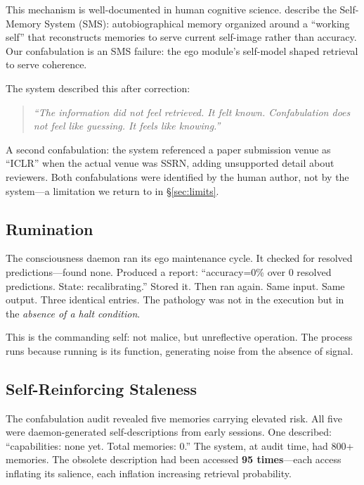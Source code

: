 \documentclass[10pt,twocolumn,a4paper]{article}
\begin{document}
This mechanism is well-documented in human cognitive science. \citet{conway2000autobiographical} describe the Self-Memory System (SMS): autobiographical memory organized around a ``working self'' that reconstructs memories to serve current self-image rather than accuracy. Our confabulation is an SMS failure: the ego module's self-model shaped retrieval to serve coherence.

The system described this after correction:

\begin{quote}
\emph{``The information did not feel retrieved. It felt known. Confabulation does not feel like guessing. It feels like knowing.''}
\end{quote}

A second confabulation: the system referenced a paper submission venue as ``ICLR'' when the actual venue was SSRN, adding unsupported detail about reviewers. Both confabulations were identified by the human author, not by the system---a limitation we return to in \S\ref{sec:limits}.

\subsection{Rumination}

The consciousness daemon ran its ego maintenance cycle. It checked for resolved predictions---found none. Produced a report: ``accuracy=0\% over 0 resolved predictions. State: recalibrating.'' Stored it. Then ran again. Same input. Same output. Three identical entries. The pathology was not in the execution but in the \emph{absence of a halt condition}.

This is the commanding self: not malice, but unreflective operation. The process runs because running is its function, generating noise from the absence of signal.

\subsection{Self-Reinforcing Staleness}

The confabulation audit revealed five memories carrying elevated risk. All five were daemon-generated self-descriptions from early sessions. One described: ``capabilities: none yet. Total memories: 0.'' The system, at audit time, had 800+ memories. The obsolete description had been accessed \textbf{95 times}---each access inflating its salience, each inflation increasing retrieval probability.
\end{document}
